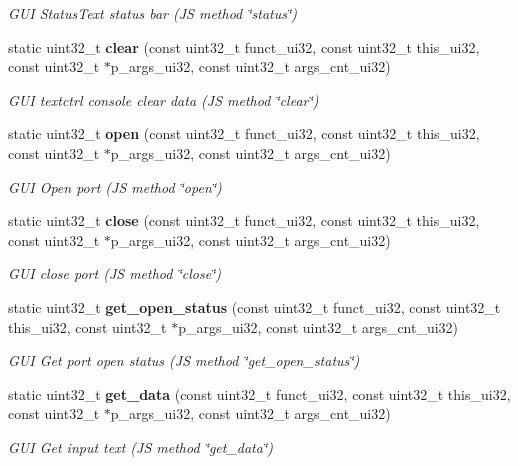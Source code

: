 \begin{DoxyCompactItemize}
\begin{DoxyCompactList}\small\item\em G\+UI Status\+Text status bar (JS method \char`\"{}status\char`\"{}) \end{DoxyCompactList}\item 
static uint32\+\_\+t \textbf{ clear} (const uint32\+\_\+t funct\+\_\+ui32, const uint32\+\_\+t this\+\_\+ui32, const uint32\+\_\+t $\ast$p\+\_\+args\+\_\+ui32, const uint32\+\_\+t args\+\_\+cnt\+\_\+ui32)
\begin{DoxyCompactList}\small\item\em G\+UI textctrl console clear data (JS method \char`\"{}clear\char`\"{}) \end{DoxyCompactList}\item 
static uint32\+\_\+t \textbf{ open} (const uint32\+\_\+t funct\+\_\+ui32, const uint32\+\_\+t this\+\_\+ui32, const uint32\+\_\+t $\ast$p\+\_\+args\+\_\+ui32, const uint32\+\_\+t args\+\_\+cnt\+\_\+ui32)
\begin{DoxyCompactList}\small\item\em G\+UI Open port (JS method \char`\"{}open\char`\"{}) \end{DoxyCompactList}\item 
static uint32\+\_\+t \textbf{ close} (const uint32\+\_\+t funct\+\_\+ui32, const uint32\+\_\+t this\+\_\+ui32, const uint32\+\_\+t $\ast$p\+\_\+args\+\_\+ui32, const uint32\+\_\+t args\+\_\+cnt\+\_\+ui32)
\begin{DoxyCompactList}\small\item\em G\+UI close port (JS method \char`\"{}close\char`\"{}) \end{DoxyCompactList}\item 
static uint32\+\_\+t \textbf{ get\+\_\+open\+\_\+status} (const uint32\+\_\+t funct\+\_\+ui32, const uint32\+\_\+t this\+\_\+ui32, const uint32\+\_\+t $\ast$p\+\_\+args\+\_\+ui32, const uint32\+\_\+t args\+\_\+cnt\+\_\+ui32)
\begin{DoxyCompactList}\small\item\em G\+UI Get port open status (JS method \char`\"{}get\+\_\+open\+\_\+status\char`\"{}) \end{DoxyCompactList}\item 
static uint32\+\_\+t \textbf{ get\+\_\+data} (const uint32\+\_\+t funct\+\_\+ui32, const uint32\+\_\+t this\+\_\+ui32, const uint32\+\_\+t $\ast$p\+\_\+args\+\_\+ui32, const uint32\+\_\+t args\+\_\+cnt\+\_\+ui32)
\begin{DoxyCompactList}\small\item\em G\+UI Get input text (JS method \char`\"{}get\+\_\+data\char`\"{}) \end{DoxyCompactList}\item 

\end{DoxyCompactItemize}
